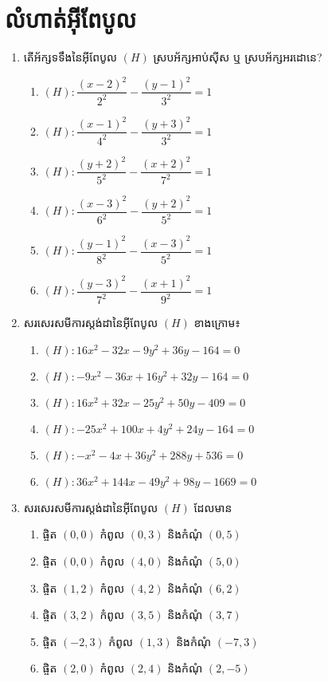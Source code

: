 \section{លំហាត់អ៊ីពែបូល}
%
\begin{enumerate}
	\item តើអ័ក្សទទឹងនៃអ៊ីពែបូល $ (H) $ ស្របអ័ក្សអាប់ស៊ីស ឬ ស្របអ័ក្សអរដោនេ?
	\begin{enumerate}[2]
		\item $ (H): \dfrac{(x-2)^2}{2^2}-\dfrac{(y-1)^2}{3^2}=1 $
		\item $ (H): \dfrac{(x-1)^2}{4^2}-\dfrac{(y+3)^2}{3^2}=1 $
		\item $ (H): \dfrac{(y+2)^2}{5^2}-\dfrac{(x+2)^2}{7^2}=1 $
		\item $ (H): \dfrac{(x-3)^2}{6^2}-\dfrac{(y+2)^2}{5^2}=1 $
		\item $ (H): \dfrac{(y-1)^2}{8^2}-\dfrac{(x-3)^2}{5^2}=1 $
		\item $ (H): \dfrac{(y-3)^2}{7^2}-\dfrac{(x+1)^2}{9^2}=1 $
	\end{enumerate}
	\item សរសេរសមីការស្តង់ដានៃអ៊ីពែបូល $ (H) $ ខាងក្រោម៖
	\begin{enumerate}
		\item $ (H):16 x^2-32 x-9 y^2+36 y-164=0 $
		\item $ (H):-9 x^2-36 x+16 y^2+32 y-164=0 $
		\item $ (H):16 x^2+32 x-25 y^2+50 y-409=0 $
		\item $ (H):-25 x^2+100 x+4 y^2+24 y-164=0 $
		\item $ (H):-x^2-4 x+36 y^2+288 y+536=0 $
		\item $ (H):36 x^2+144 x-49 y^2+98 y-1669=0 $
	\end{enumerate}
	\item សរសេរសមីការស្តង់ដានៃអ៊ីពែបូល $ (H) $ ដែលមាន
	\begin{enumerate}
		\item ផ្ចិត $ (0,0) $ កំពូល $ (0,3) $ និងកំណុំ $ (0,5) $
		\item ផ្ចិត $ (0,0) $ កំពូល $ (4,0) $ និងកំណុំ $ (5,0) $
		\item ផ្ចិត $ (1,2) $ កំពូល $ (4,2) $ និងកំណុំ $ (6,2) $
		\item ផ្ចិត $ (3,2) $ កំពូល $ (3,5) $ និងកំណុំ $ (3,7) $
		\item ផ្ចិត $ (-2,3) $ កំពូល $ (1,3) $ និងកំណុំ $ (-7,3) $
		\item ផ្ចិត $ (2,0) $ កំពូល $ (2,4) $ និងកំណុំ $ (2,-5) $
	\end{enumerate}

\end{enumerate}
